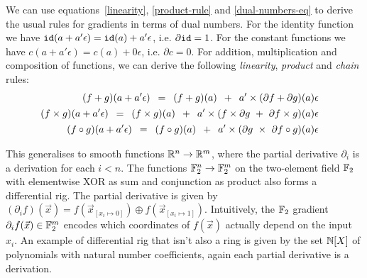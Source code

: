 We can use equations~\ref{linearity}, \ref{product-rule} and \ref{dual-numbers-eq}
to derive the usual rules for gradients in terms of dual numbers.
For the identity function we have $\mathtt{id}(a + a' \epsilon) = \mathtt{id}(a) + a' \epsilon$,
i.e. $\partial \mathtt{id} = 1$. For the constant functions we have $c(a + a' \epsilon) =
c(a) + 0 \epsilon$, i.e. $\partial c = 0$.
For addition, multiplication and composition of functions, we can derive the
following \emph{linearity}, \emph{product} and \emph{chain} rules:
\begin{align} \begin{split}
    (f + g)(a + a' \epsilon)
    \s &= \s (f + g)(a) \s + \s a' \times (\partial f + \partial g)(a) \epsilon
\end{split}\\ \begin{split}
    (f \times g)(a + a' \epsilon)
    \s &= \s (f \times g)(a) \s + \s a' \times (f \times \partial g \ + \ \partial f \times g)(a) \epsilon
\end{split}\\ \begin{split}
    (f \circ g)(a + a' \epsilon)
    \s &= \s (f \circ g)(a) \s + \s a' \times (\partial g \ \times \ \partial f \circ g)(a) \epsilon
\end{split} \end{align}

This generalises to smooth functions $\mathbb{R}^n \to \mathbb{R}^m$, where the partial
derivative $\partial_i$ is a derivation for each $i < n$.
The functions $\mathbb{F}_2^n \to \mathbb{F}_2^m$ on the two-element
field $\mathbb{F}_2$ with elementwise XOR as sum and conjunction as product
also forms a differential rig.
The partial derivative is given by $(\partial_i f)(\vec{x}) =
f(\vec{x}_{[x_i \mapsto 0]}) \oplus f(\vec{x}_{[x_i \mapsto 1]})$.
Intuitively, the $\mathbb{F}_2$ gradient $\partial_i f(\vec{x}) \in \mathbb{F}_2^m$ encodes
which coordinates of $f(\vec{x})$ actually depend on the input $x_i$.
An example of differential rig that isn't also a ring is given by the set
$\mathbb{N}[X]$ of polynomials with natural number coefficients, again each
partial derivative is a derivation.

